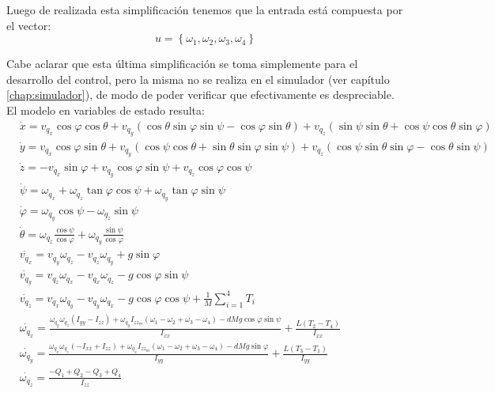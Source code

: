 \documentclass[main]{subfiles}
\begin{document}
Luego de realizada esta simplificaci\'on tenemos que la entrada est\'a compuesta por el vector:
\begin{equation}
\boxed{u=\left\lbrace\omega_1, \omega_2, \omega_3, \omega_4\right\rbrace}
\end{equation}

Cabe aclarar que esta \'ultima simplificaci\'on se toma simplemente para el desarrollo del control, pero la misma no se realiza en el simulador (ver cap\'itulo \ref{chap:simulador}), de modo de poder verificar que efectivamente es despreciable.\\

El modelo en variables de estado resulta:
\begin{equation}
\boxed{\begin{aligned}&\dot{x}=v_{q_x} \cos \varphi \cos \theta + v_{q_y} ( \cos \theta \sin \varphi \sin \psi-\cos \varphi \sin \theta ) + v_{q_z}(\sin \psi \sin \theta + \cos \psi \cos \theta \sin \varphi)\\
&\dot{y}=v_{q_x} \cos \varphi \sin \theta + v_{q_y} (\cos \psi \cos \theta + \sin \theta \sin \varphi \sin \psi) + v_{q_z}( \cos \psi \sin \theta \sin \varphi-\cos \theta \sin \psi )\\
&\dot{z}= -v_{q_x} \sin \varphi  + v_{q_y} \cos \varphi \sin \psi  + v_{q_z}\cos \varphi \cos \psi\\
&\dot{\psi}=\omega_{q_x} + \omega_{q_z}\tan\varphi \cos\psi + \omega_{q_y}\tan\varphi \sin\psi\\
&\dot{\varphi}=\omega_{q_y}\cos \psi - \omega_{q_z}\sin\psi\\
&\dot{\theta}=\omega_{q_z} \frac{\cos\psi}{\cos\varphi}  + \omega_{q_y}\frac{\sin\psi}{\cos\varphi}\\
&\dot{v_{q_x}}=v_{q_y} \omega_{q_z} - v_{q_z} \omega_{q_y}+g\sin\varphi\\
&\dot{v_{q_y}}=v_{q_z} \omega_{q_x} - v_{q_x} \omega_{q_z}-g\cos\varphi\sin\psi\\
&\dot{v_{q_z}}=v_{q_x} \omega_{q_y} - v_{q_y} \omega_{q_x}-g\cos\varphi\cos\psi+\frac{1}{M}\sum_{i=1}^4T_i\\
&\dot{\omega_{q_x}}=\frac{\omega_{q_y}\omega_{q_z}(I_{yy}-I_{zz})+\omega_{q_y}I_{zz_m}(\omega_1-\omega_2+\omega_3-\omega_4)-dMg\cos\varphi\sin\psi}{I_{xx}}+\frac{L(T_2-T_4)}{I_{xx}}\\
&\dot{\omega_{q_y}}=\frac{\omega_{q_x}\omega_{q_z}(-I_{xx}+I_{zz})+\omega_{q_x}I_{zz_m}(\omega_1-\omega_2+\omega_3-\omega_4)-dMg\sin\varphi}{{I_{yy}}}+\frac{L(T_3-T_1)}{I_{yy}}\\
&\dot{\omega_{q_z}}=\frac{-Q_1+Q_2-Q_3+Q_4}{I_{zz}}\\
\end{aligned}}
\label{eq:modelo}
\end{equation}
\end{document}

